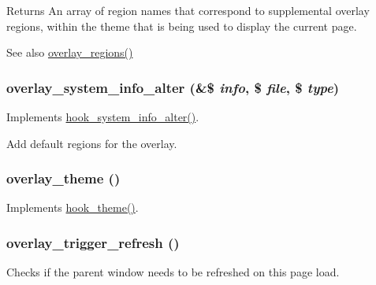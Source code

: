 \begin{DoxyReturn}{Returns}
An array of region names that correspond to supplemental overlay regions, within the theme that is being used to display the current page.
\end{DoxyReturn}
\begin{DoxySeeAlso}{See also}
\hyperlink{overlay_8module_abc2ab232b7d87656670589aacbf8f97c}{overlay\_\-regions()} 
\end{DoxySeeAlso}
\hypertarget{overlay_8module_aa8e4ba0eea8feabeb12f50a884228b07}{
\subsubsection[{overlay\_\-system\_\-info\_\-alter}]{\setlength{\rightskip}{0pt plus 5cm}overlay\_\-system\_\-info\_\-alter (\&\$ {\em info}, \/  \$ {\em file}, \/  \$ {\em type})}}
\label{overlay_8module_aa8e4ba0eea8feabeb12f50a884228b07}
Implements \hyperlink{group__hooks_ga7dd7f887131916d5bbbb02ae87a9113e}{hook\_\-system\_\-info\_\-alter()}.

Add default regions for the overlay. \hypertarget{overlay_8module_affc885d56daf12cc33756c9ddeb5ff38}{
\subsubsection[{overlay\_\-theme}]{\setlength{\rightskip}{0pt plus 5cm}overlay\_\-theme ()}}
\label{overlay_8module_affc885d56daf12cc33756c9ddeb5ff38}
Implements \hyperlink{group__hooks_ga013ccb45c7aaab1c16cf9691428c910d}{hook\_\-theme()}. \hypertarget{overlay_8module_ae3025a7d3191c492aa55e2bcf1518e67}{
\subsubsection[{overlay\_\-trigger\_\-refresh}]{\setlength{\rightskip}{0pt plus 5cm}overlay\_\-trigger\_\-refresh ()}}
\label{overlay_8module_ae3025a7d3191c492aa55e2bcf1518e67}
Checks if the parent window needs to be refreshed on this page load.

